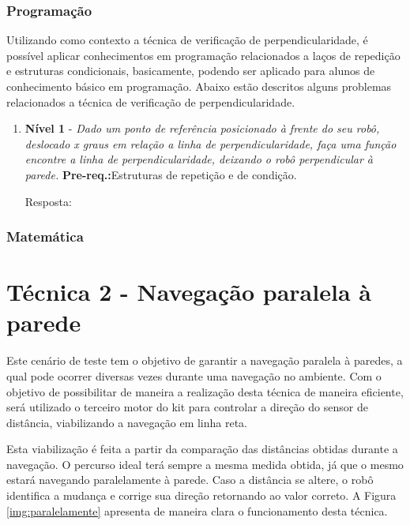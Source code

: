 		\subsubsection{Programação}
		\label{sec:tec1_prog}

			Utilizando como contexto a técnica de verificação de perpendicularidade, é possível aplicar conhecimentos em programação relacionados a laços de repedição e estruturas condicionais, basicamente, podendo ser aplicado para alunos de conhecimento básico em programação. Abaixo estão descritos alguns problemas relacionados a técnica de verificação de perpendicularidade.

			\begin{enumerate}
				\item \textbf{Nível 1} - \textit{Dado um ponto de referência posicionado à frente do seu robô, deslocado x graus em relação a linha de perpendicularidade, faça uma função encontre a linha de perpendicularidade, deixando o robô perpendicular à parede.} \textbf{Pre-req.:}Estruturas de repetição e de condição.

				Resposta:


			\end{enumerate} 
		\subsubsection{Matemática}
		\label{sec:tec1_mat}

\section{Técnica 2 - Navegação paralela à parede} %
\label{sec:técnica_2_navegação_paralela_à_parede}
	
	Este cenário de teste tem o objetivo de garantir a navegação paralela à paredes, a qual pode ocorrer diversas vezes durante uma navegação no ambiente. Com o objetivo de possibilitar de maneira a realização desta técnica de maneira eficiente, será utilizado o terceiro motor do kit para controlar a direção do sensor de distância, viabilizando a navegação em linha reta.

	Esta viabilização é feita a partir da comparação das distâncias obtidas durante a navegação. O percurso ideal terá sempre a mesma medida obtida, já que o mesmo estará navegando paralelamente à parede. Caso a distância se altere, o robô identifica a mudança e corrige sua direção retornando ao valor correto. A Figura \ref{img:paralelamente} apresenta de maneira clara o funcionamento desta técnica.

